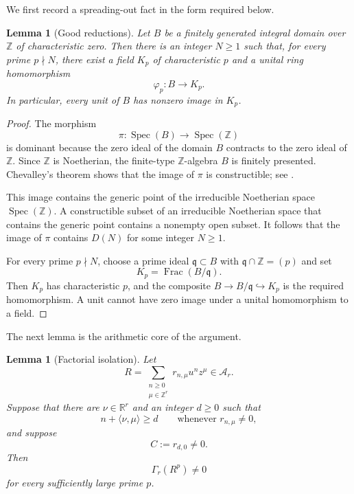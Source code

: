 \documentclass[11pt]{article}
\numberwithin{equation}{section}
\newtheorem{lemma}[theorem]{Lemma}
\theoremstyle{definition}
\theoremstyle{remark}
\newcommand{\R}{\mathbb R}
\newcommand{\Z}{\mathbb Z}
\newcommand{\A}{\mathcal A}
\newcommand{\Spec}{\operatorname{Spec}}
\begin{document}
We first record a spreading-out fact in the form required below.

\begin{lemma}[Good reductions]\label{lem:good-reductions}
Let $B$ be a finitely generated integral domain over $\Z$ of characteristic
zero.  Then there is an integer $N\ge1$ such that, for every prime
$p\nmid N$, there exist a field $K_p$ of characteristic $p$ and a unital ring
homomorphism
\[
  \varphi_p:B\longrightarrow K_p.
\]
In particular, every unit of $B$ has nonzero image in $K_p$.
\end{lemma}

\begin{proof}
The morphism
\[
  \pi:\Spec(B)\longrightarrow\Spec(\Z)
\]
is dominant because the zero ideal of the domain $B$ contracts to the zero
ideal of $\Z$.  Since $\Z$ is Noetherian, the finite-type $\Z$-algebra $B$
is finitely presented.  Chevalley's theorem shows that the image of $\pi$ is
constructible; see \cite[Tag 00FE]{StacksProject}.

This image contains the generic point of the irreducible Noetherian space
$\Spec(\Z)$.  A constructible subset of an irreducible Noetherian space that
contains the generic point contains a nonempty open subset.  It follows that
the image of $\pi$ contains $D(N)$ for some integer $N\ge1$.

For every prime $p\nmid N$, choose a prime ideal $\mathfrak q\subset B$ with
$\mathfrak q\cap\Z=(p)$ and set
\[
  K_p=\operatorname{Frac}(B/\mathfrak q).
\]
Then $K_p$ has characteristic $p$, and the composite
$B\to B/\mathfrak q\hookrightarrow K_p$ is the required homomorphism.  A
unit cannot have zero image under a unital homomorphism to a field.
\end{proof}

The next lemma is the arithmetic core of the argument.

\begin{lemma}[Factorial isolation]\label{lem:factorial-isolation}
Let
\[
  R=\sum_{\substack{n\ge0\\ \mu\in\Z^r}}
  r_{n,\mu}u^nz^\mu\in\A_r.
\]
Suppose that there are $\nu\in\R^r$ and an integer $d\ge0$ such that
\begin{equation}\label{eq:R-lower-degree}
  n+\langle\nu,\mu\rangle\ge d
  \qquad\text{whenever }r_{n,\mu}\ne0,
\end{equation}
and suppose
\begin{equation}\label{eq:C-rd0}
  C:=r_{d,0}\ne0.
\end{equation}
Then
\[
  \Gamma_r(R^p)\ne0
\]
for every sufficiently large prime $p$.
\end{lemma}
\end{document}
